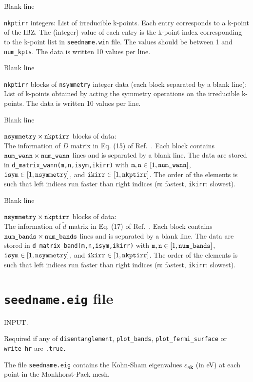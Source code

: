 Blank line 

\verb#nkptirr# integers:  
List of irreducible k-points. 
Each entry corresponds to a k-point of the IBZ. The (integer) value of each entry
is the k-point index corresponding to the k-point list in \verb#seedname.win# file. 
The values should be between 1 and \verb#num_kpts#. The data is written 10 values per line.

Blank line 

\verb#nkptirr# blocks of  \verb#nsymmetry# integer data (each block separated by a blank line): 
List of k-points obtained by acting the symmetry operations on the irreducible k-points. 
The data is written 10 values per line.

Blank line 

$\verb#nsymmetry# \times \verb#nkptirr# $ blocks of data: \\
The information of $D$ matrix in Eq. (15) of Ref.~\cite{sakuma-prb13}. 
Each block contains $\verb#num_wann# \times \verb#num_wann#$ lines and is separated by a blank line. 
The data are stored in  \verb#d_matrix_wann(m,n,isym,ikirr)# with 
$\verb#m#, \verb#n# \in [1,\verb#num_wann#]$, $\verb#isym# \in [1,\verb#nsymmetry#]$, and $\verb#ikirr# \in [1,\verb#nkptirr#]$. 
The order of the elements is such that left indices run faster than right indices (\verb#m#: fastest,  \verb#ikirr#: slowest).
 
Blank line 

$\verb#nsymmetry# \times \verb#nkptirr# $ blocks of data: \\
The information of $\tilde d$ matrix in Eq. (17) of Ref.~\cite{sakuma-prb13}. 
Each block contains $\verb#num_bands# \times \verb#num_bands#$ lines and is separated by a blank line.
The data are stored in  \verb#d_matrix_band(m,n,isym,ikirr)# with 
$\verb#m#, \verb#n# \in [1,\verb#num_bands#]$, $\verb#isym# \in [1,\verb#nsymmetry#]$, and $\verb#ikirr# \in [1,\verb#nkptirr#]$. 
The order of the elements is such that left indices run faster than right indices (\verb#m#: fastest,  \verb#ikirr#: slowest). 


\section{{\tt seedname.eig} file}

INPUT. 

Required if any of \verb#disentanglement#, \verb#plot_bands#,
   \verb#plot_fermi_surface# or \verb#write_hr# are \verb#.true.#

The file \verb#seedname.eig# contains the Kohn-Sham eigenvalues
     $\varepsilon_{n\mathbf{k}}$ (in eV) at each point in the
     Monkhorst-Pack mesh.

